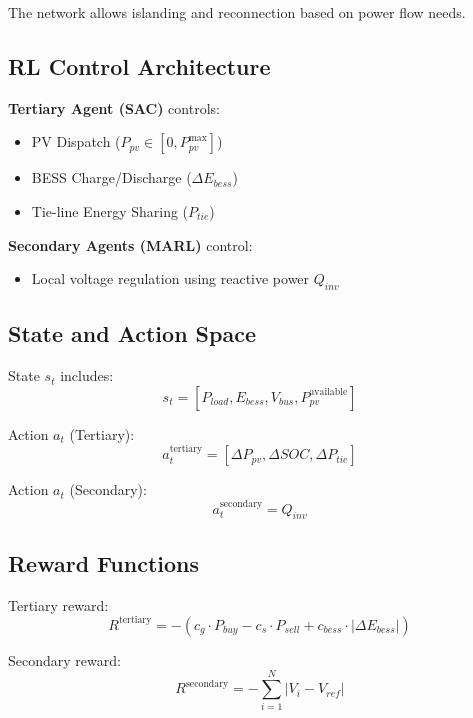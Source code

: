 \documentclass[11pt]{article}
\begin{document}
The network allows islanding and reconnection based on power flow needs.

\subsection{RL Control Architecture}
\textbf{Tertiary Agent (SAC)} controls:
\begin{itemize}
  \item PV Dispatch ($P_{pv} \in [0, P_{pv}^{\text{max}}]$)
  \item BESS Charge/Discharge ($\Delta E_{bess}$)
  \item Tie-line Energy Sharing ($P_{tie}$)
\end{itemize}

\textbf{Secondary Agents (MARL)} control:
\begin{itemize}
  \item Local voltage regulation using reactive power $Q_{inv}$
\end{itemize}

\subsection{State and Action Space}
State $s_t$ includes:
\begin{equation}
s_t = \left[ P_{load}, E_{bess}, V_{bus}, P_{pv}^{\text{available}} \right]
\end{equation}

Action $a_t$ (Tertiary):
\begin{equation}
a_t^{\text{tertiary}} = [\Delta P_{pv}, \Delta SOC, \Delta P_{tie}]
\end{equation}

Action $a_t$ (Secondary):
\begin{equation}
a_t^{\text{secondary}} = Q_{inv}
\end{equation}

\subsection{Reward Functions}
Tertiary reward:
\begin{equation}
R^{\text{tertiary}} = - \left( c_g \cdot P_{buy} - c_s \cdot P_{sell} + c_{bess} \cdot |\Delta E_{bess}| \right)
\end{equation}

Secondary reward:
\begin{equation}
R^{\text{secondary}} = - \sum_{i=1}^{N} \left| V_i - V_{ref} \right|
\end{equation}
\end{document}
